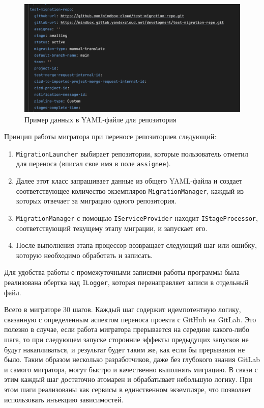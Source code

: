 \begin{figure}[H]
  \centering
  \includegraphics[width=12cm]{img/migration-state-file}
  \caption{Пример данных в YAML-файле для репозитория}
  \label{fig:migration-state-file}
\end{figure}

Принцип работы мигратора при переносе репозиториев следующий:
\begin{enumerate}
  \item \texttt{MigrationLauncher} выбирает репозитории, которые пользователь отметил для переноса (вписал свое имя в поле \texttt{assignee}).
  \item Далее этот класс запрашивает данные из общего YAML-файла и создает соответствующее количество экземпляров \texttt{MigrationManager},
        каждый из которых отвечает за миграцию одного репозитория.
  \item \texttt{MigrationManager} с помощью \texttt{IServiceProvider} находит \texttt{IStageProcessor},
        соответствующий текущему этапу миграции, и запускает его.
  \item После выполнения этапа процессор возвращает следующий шаг или ошибку, которую необходимо обработать и записать.
\end{enumerate}

Для удобства работы с промежуточными записями работы программы была реализована обертка над \texttt{ILogger},
которая перенаправляет записи в отдельный файл.

Всего в миграторе 30 шагов.
Каждый шаг содержит идемпотентную логику, связанную с определенным аспектом переноса проекта с GitHub на GitLab.
Это полезно в случае, если работа мигратора прерывается на середине какого-либо шага, то при следующем запуске сторонние эффекты предыдущих запусков не будут накапливаться, и результат будет таким же, как если бы прерывания не было.
Таким образом несколько разработчиков, даже без глубокого знания GitLab и самого мигратора, могут быстро и качественно выполнять миграцию.
В связи с этим каждый шаг достаточно атомарен и обрабатывает небольшую логику.
При этом шаги реализованы как сервисы в единственном экземпляре, что позволяет использовать инъекцию зависимостей.


